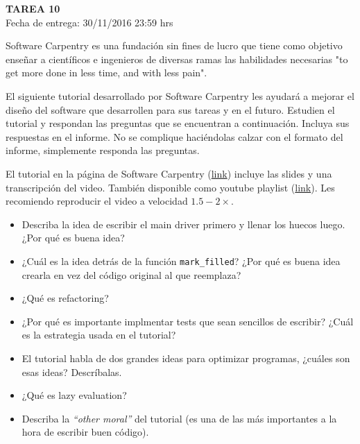 \documentclass[letter, 11pt]{article}
\newcommand{\tareanro}{10}
\newcommand{\fechaentrega}{30/11/2016 23:59 hrs}
\begin{document}
\thispagestyle{firstpage}

\begin{center}
  {\uppercase{\LARGE \bf Tarea \tareanro}}\\
  Fecha de entrega: \fechaentrega
\end{center}




Software Carpentry es una fundación sin fines de lucro que tiene como objetivo
enseñar a científicos e ingenieros de diversas ramas las habilidades necesarias
"to get more done in less time, and with less pain".

El siguiente tutorial desarrollado por Software Carpentry les ayudará a mejorar
el diseño del software que desarrollen para sus tareas y en el futuro. Estudien
el tutorial y respondan las preguntas que se encuentran a continuación.
Incluya sus respuestas en el informe. No se complique haciéndolas calzar con el
formato del informe, simplemente responda las preguntas.

El tutorial en la página de Software Carpentry
(\href{http://swcarpentry.github.io/v4/invperc/index.html}{link}) incluye las
slides y una transcripción del video. También disponible como youtube playlist
(\href{https://www.youtube.com/playlist?list=PL5859017B018F03F4}{link}). Les
recomiendo reproducir el video a velocidad $1.5 - 2\times$.

\begin{itemize}

\item Describa la idea de escribir el main driver primero y llenar los huecos
  luego. ¿Por qué es buena idea?

\item ¿Cuál es la idea detrás de la función \texttt{mark\_filled}? ¿Por qué es
  buena idea crearla en vez del código original al que reemplaza?

\item ¿Qué es refactoring?

\item ¿Por qué es importante implmentar tests que sean sencillos de escribir?
  ¿Cuál es la estrategia usada en el tutorial?

\item El tutorial habla de dos grandes ideas para optimizar programas, ¿cuáles
  son esas ideas? Descríbalas.

\item ¿Qué es lazy evaluation?

\item Describa la \emph{``other moral''} del tutorial (es una de las más
  importantes a la hora de escribir buen código).

\end{itemize}
\end{document}
